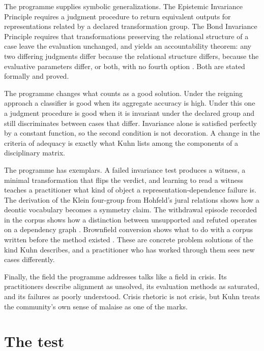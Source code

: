 \documentclass[11pt,letterpaper]{article}
\begin{document}
The programme supplies symbolic generalizations. The Epistemic Invariance
Principle requires a judgment procedure to return equivalent outputs for
representations related by a declared transformation group. The Bond Invariance
Principle requires that transformations preserving the relational structure of a
case leave the evaluation unchanged, and yields an accountability theorem: any
two differing judgments differ because the relational structure differs, because
the evaluative parameters differ, or both, with no fourth option
\citep{foundation}. Both are stated formally and proved.

The programme changes what counts as a good solution. Under the reigning
approach a classifier is good when its aggregate accuracy is high. Under this
one a judgment procedure is good when it is invariant under the declared group
and still discriminates between cases that differ. Invariance alone is
satisfied perfectly by a constant function, so the second condition is not
decoration. A change in the criteria of adequacy is exactly what Kuhn lists among
the components of a disciplinary matrix.

The programme has exemplars. A failed invariance test produces a witness, a
minimal transformation that flips the verdict, and learning to read a witness
teaches a practitioner what kind of object a representation-dependence failure
is. The derivation of the Klein four-group from Hohfeld's jural relations
\citep{hohfeld1913} shows how a deontic vocabulary becomes a symmetry claim. The
withdrawal episode recorded in the corpus shows how a distinction between
unsupported and refuted operates on a dependency graph \citep{pecls}. Brownfield
conversion shows what to do with a corpus written before the method existed
\citep{pebrw}. These are concrete problem solutions of the kind Kuhn describes,
and a practitioner who has worked through them sees new cases differently.

Finally, the field the programme addresses talks like a field in crisis. Its
practitioners describe alignment as unsolved, its evaluation methods as
saturated, and its failures as poorly understood. Crisis rhetoric is not crisis,
but Kuhn treats the community's own sense of malaise as one of the marks.

\section{The test}
\end{document}
